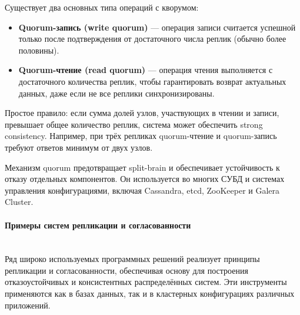 Существует два основных типа операций с кворумом:
\begin{itemize}
    \item \textbf{Quorum-запись (write quorum)} — операция записи считается успешной только после подтверждения от достаточного числа реплик (обычно более половины).
    \item \textbf{Quorum-чтение (read quorum)} — операция чтения выполняется с достаточного количества реплик, чтобы гарантировать возврат актуальных данных, даже если не все реплики синхронизированы.
\end{itemize}

Простое правило: если сумма долей узлов, участвующих в чтении и записи, превышает общее количество реплик, система может обеспечить strong consistency. Например, при трёх репликах quorum-чтение и quorum-запись требуют ответов минимум от двух узлов.

Механизм quorum предотвращает split-brain и обеспечивает устойчивость к отказу отдельных компонентов. Он используется во многих СУБД и системах управления конфигурациями, включая Cassandra, etcd, ZooKeeper и Galera Cluster.

\paragraph{Примеры систем репликации и согласованности} ~\\

Ряд широко используемых программных решений реализует принципы репликации и согласованности, обеспечивая основу для построения отказоустойчивых и консистентных распределённых систем. Эти инструменты применяются как в базах данных, так и в кластерных конфигурациях различных приложений.

